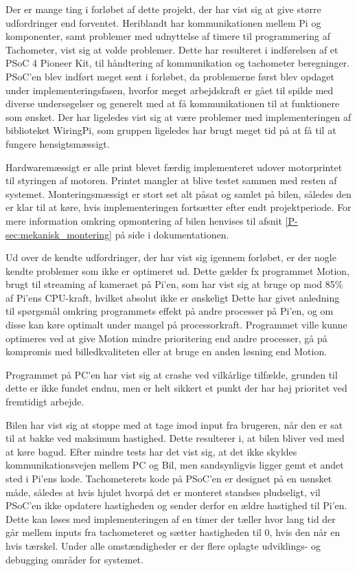 Der er mange ting i forløbet af dette projekt, der har vist sig at give større udfordringer end forventet. 
Heriblandt har \IIC kommunikationen mellem Pi og \IIC komponenter, samt problemer med udnyttelse af timere til programmering af Tachometer, vist sig at volde problemer. 
Dette har resulteret i indførelsen af et PSoC 4 Pioneer Kit, til håndtering af \IIC kommunikation og tachometer beregninger. 
PSoC'en blev indført meget sent i forløbet, da problemerne først blev opdaget under implementeringsfasen, hvorfor meget arbejdskraft er gået til spilde med diverse undersøgelser og generelt med at få kommunikationen til at funktionere som ønsket. 
Der har ligeledes vist sig at være problemer med implementeringen af biblioteket WiringPi, som gruppen ligeledes har brugt meget tid på at få til at fungere hensigtsmæssigt.

Hardwaremæssigt er alle print blevet færdig implementeret udover motorprintet til styringen af motoren. 
Printet mangler at blive testet sammen med resten af systemet.
Monteringsmæssigt er stort set alt påsat og samlet på bilen, således den er klar til at køre, hvis implementeringen fortsætter efter endt projektperiode. For mere information omkring opmontering af bilen henvises til afsnit \ref{P-sec:mekanisk_montering}  på side \pageref{P-sec:mekanisk_montering} i dokumentationen.

Ud over de kendte udfordringer, der har vist sig igennem forløbet, er der nogle kendte problemer som ikke er optimeret ud. 
Dette gælder fx programmet Motion, brugt til streaming af kameraet på Pi'en, som har vist sig at bruge op mod 85\% af Pi'ens CPU-kraft, hvilket absolut ikke er ønskeligt
Dette har givet anledning til spørgsmål omkring programmets effekt på andre processer på Pi'en, og om disse kan køre optimalt under mangel på processorkraft. 
Programmet ville kunne optimeres ved at give Motion mindre prioritering end andre processer, gå på kompromis med billedkvaliteten eller at bruge en anden løsning end Motion.

Programmet på PC'en har vist sig at crashe ved vilkårlige tilfælde, grunden til dette er ikke fundet endnu, men er helt sikkert et punkt der har høj prioritet ved fremtidigt arbejde.

Bilen har vist sig at stoppe med at tage imod input fra brugeren, når den er sat til at bakke ved maksimum hastighed. Dette resulterer i, at bilen bliver ved med at køre bagud. Efter mindre tests har det vist sig, at det ikke skyldes kommunikationsvejen mellem PC og Bil, men sandsynligvis ligger gemt et andet sted i Pi'ens kode. Tachometerets kode på PSoC'en er designet på en uønsket måde, således at hvis hjulet hvorpå det er monteret standses pludseligt, vil PSoC'en ikke opdatere hastigheden og sender derfor en ældre hastighed til Pi'en. Dette kan løses med implementeringen af en timer der tæller hvor lang tid der går mellem inputs fra tachometeret og sætter hastigheden til 0, hvis den når en hvis tærskel. 
Under alle omstændigheder er der flere oplagte udviklings- og debugging områder for systemet.

